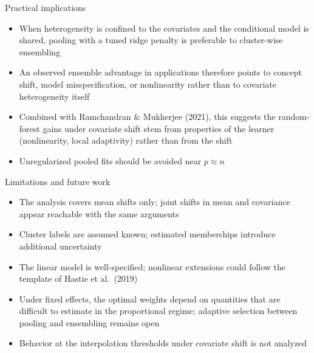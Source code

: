 \documentclass[aspectratio=169,11pt]{beamer}
\begin{document}
\begin{frame}{Practical implications}
  \begin{itemize}
    \item When heterogeneity is confined to the covariates and the conditional model is shared, pooling with a tuned ridge penalty is preferable to cluster-wise ensembling
    \item An observed ensemble advantage in applications therefore points to concept shift, model misspecification, or nonlinearity rather than to covariate heterogeneity itself
    \item Combined with Ramchandran \& Mukherjee (2021), this suggests the random-forest gains under covariate shift stem from properties of the learner (nonlinearity, local adaptivity) rather than from the shift
    \item Unregularized pooled fits should be avoided near $p \approx n$
  \end{itemize}
\end{frame}

\begin{frame}{Limitations and future work}
  \begin{itemize}
    \item The analysis covers mean shifts only; joint shifts in mean and covariance appear reachable with the same arguments
    \item Cluster labels are assumed known; estimated memberships introduce additional uncertainty
    \item The linear model is well-specified; nonlinear extensions could follow the template of Hastie et al.\ (2019)
    \item Under fixed effects, the optimal weights depend on quantities that are difficult to estimate in the proportional regime; adaptive selection between pooling and ensembling remains open
    \item Behavior at the interpolation thresholds under covariate shift is not analyzed
  \end{itemize}
\end{frame}
\end{document}

